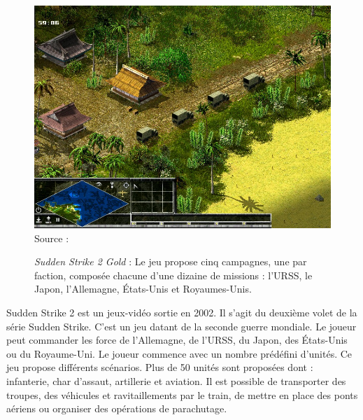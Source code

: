 \begin{figure}[H]
    \centering
    \includegraphics[scale=0.3]{data/sudden_strike_2.jpg}\\
    Source : 
    \caption{\textit{Sudden Strike 2 Gold} : Le jeu propose cinq campagnes, une par faction, composée chacune d’une dizaine de missions : l'URSS, le Japon, l'Allemagne, États-Unis et Royaumes-Unis.}
\end{figure}

Sudden Strike 2 est un jeux-vidéo sortie en 2002. Il s'agit du deuxième volet de la série Sudden Strike. C'est un jeu datant de la seconde guerre mondiale.
Le joueur peut commander les force de l’Allemagne, de l’URSS, du Japon, des États-Unis ou du Royaume-Uni.
Le joueur commence avec un nombre prédéfini d'unités. Ce jeu propose différents scénarios. Plus de 50 unités sont proposées dont : infanterie, char d'assaut, artillerie et aviation.
Il est possible de transporter des troupes, des véhicules et ravitaillements par le train, de mettre en place des ponts aériens ou organiser des opérations de parachutage.


